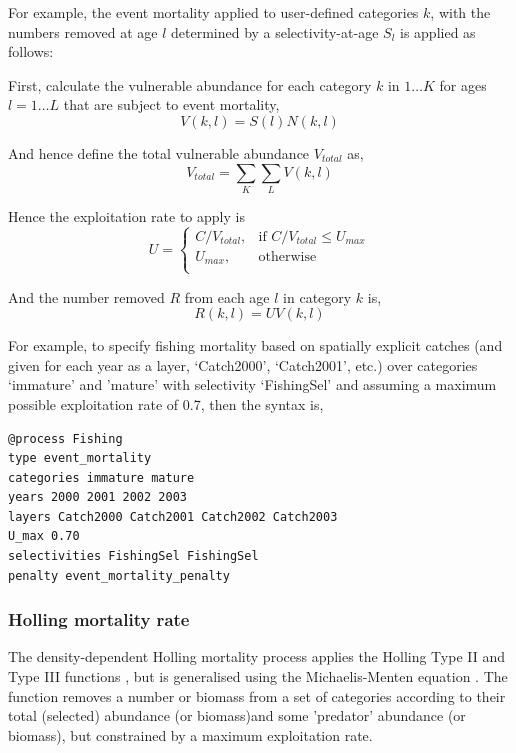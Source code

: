 For example, the event mortality applied to user-defined categories $k$, with the numbers removed at age $l$ determined by a selectivity-at-age $S_l$ is applied as follows:

First, calculate the vulnerable abundance for each category $k$ in $1 \ldots K$ for ages $l = 1 \ldots L$ that are subject to event mortality,
\begin{equation}
  V(k,l) = S(l) N(k,l)
\end{equation}

And hence define the total vulnerable abundance $V_{total}$ as,
\begin{equation}
  V_{total}  = \sum\limits_K {\sum\limits_L {V(k,l)}} 
\end{equation}

Hence the exploitation rate to apply is 
\begin{equation}
U = \begin{cases}
  C/V_{total}, & \text{if $C/V_{total} \leq U_{max}$} \\
  U_{max}, & \text{otherwise}\\ 
  \end{cases} 
\end{equation}

And the number removed $R$ from each age $l$ in category $k$ is,
\begin{equation}
  R(k,l) = UV(k,l)
\end{equation}

For example, to specify fishing mortality based on spatially explicit catches (and given for each year as a layer, `Catch2000', `Catch2001', etc.) over categories `immature' and 'mature' with selectivity `FishingSel' and assuming a maximum possible exploitation rate of 0.7, then the syntax is,
{\small{\begin{verbatim}
@process Fishing
type event_mortality
categories immature mature
years 2000 2001 2002 2003
layers Catch2000 Catch2001 Catch2002 Catch2003
U_max 0.70
selectivities FishingSel FishingSel
penalty event_mortality_penalty
\end{verbatim}}}

\subsubsection*{Holling mortality rate}

The density-dependent Holling mortality process applies the Holling Type II and Type III functions \citep{Holling1959}, but is generalised using the Michaelis-Menten equation \citep{MentenMichaelis1913}. The function removes a number or biomass from a set of categories according to their total (selected) abundance (or biomass)and some 'predator' abundance (or biomass), but constrained by a maximum exploitation rate.

